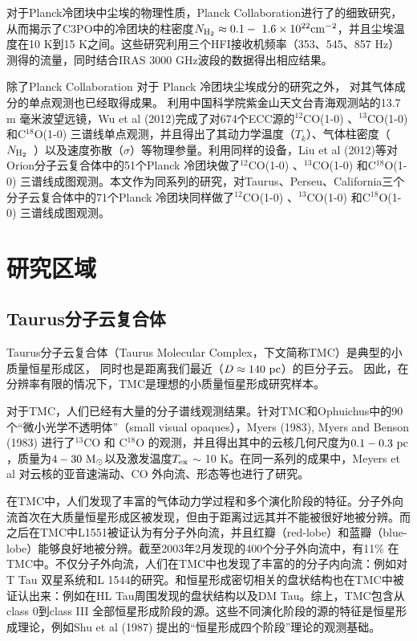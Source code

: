 \documentclass[UTF8]{pkuthss}
\newcommand{\cob}{$^{13}$CO }
\newcommand{\coc}{C$^{18}$O }
\newcommand{\coaa}{$^{12}$CO(1-0) }
\newcommand{\cobb}{$^{13}$CO(1-0) }
\newcommand{\cocc}{C$^{18}$O(1-0) }
\newcommand{\texc}{$T_{\rm {ex}}$ }
\newcommand{\nhyd}{$N_{\rm H_2}$\ }
\begin{document}
		对于Planck冷团块中尘埃的物理性质，Planck Collaboration进行了的细致研究，从而揭示了C3PO中的冷团块的柱密度$N_ {\rm H_2} \approx 0.1 \rm - \ 1.6 \times 10^{22} \rm cm^{-2}$，并且尘埃温度在10 K到15 K之间\supercite{2011A&A...536A..23P}。这些研究利用三个HFI接收机频率（353、545、857 Hz）测得的流量，同时结合IRAS 3000 GHz波段的数据得出相应结果\supercite{2011A&A...536A..23P,2011A&A...536A..22P}。

		除了Planck Collaboration 对于 Planck 冷团块尘埃成分的研究之外， 对其气体成分的单点观测也已经取得成果。 利用中国科学院紫金山天文台青海观测站的13.7 m 毫米波望远镜，Wu et al (2012)完成了对674个ECC源的\coaa 、\cobb  和\cocc  三谱线单点观测，并且得出了其动力学温度（$T_k$）、气体柱密度（\nhyd）以及速度弥散（$\sigma$）等物理参量\supercite{wu2012gas}。利用同样的设备，Liu et al (2012)等对Orion分子云复合体中的51个Planck 冷团块做了\coaa 、\cobb  和\cocc  三谱线成图观测\supercite{LiuTie}。本文作为同系列的研究，对Taurus、Perseu、California三个分子云复合体中的71个Planck 冷团块同样做了\coaa 、\cobb  和\cocc  三谱线成图观测。

	\section{研究区域}

		\subsection{Taurus分子云复合体}

			Taurus分子云复合体（Taurus Molecular Complex，下文简称TMC）是典型的小质量恒星形成区， 同时也是距离我们最近（$D\approx 140\rm\ pc$）的巨分子云\supercite{1987ApJ...322..706D}。 因此，在分辨率有限的情况下，TMC是理想的小质量恒星形成研究样本。

			对于TMC，人们已经有大量的分子谱线观测结果。针对TMC和Ophuichus中的90个“微小光学不透明体”（small visual opaques），Myers (1983), Myers and Benson (1983) 进行了\cob 和 \coc 的观测，并且得出其中的云核几何尺度为$0.1-0.3 \ \rm pc$，质量为$4-30\ \rm M_\odot$以及激发温度\texc $\sim$ 10 K\supercite{1983ApJ...264..517M,1983ApJ...266..309M}。在同一系列的成果中，Meyers et al 对云核的亚音速湍动、CO 外向流、形态等也进行了研究\supercite{1983ApJ...270..105M,1988ApJ...324..907M,1991ApJ...376..561M}。

			在TMC中，人们发现了丰富的气体动力学过程和多个演化阶段的特征。分子外向流首次在大质量恒星形成区被发现，但由于距离过远其并不能被很好地被分辨\supercite{1976ApJ...209L.137Z}。而之后在TMC中L1551被证认为有分子外向流，并且红瓣（red-lobe）和蓝瓣（blue-lobe）能够良好地被分辨\supercite{1980ApJ...239L..17S}。截至2003年2月发现的400个分子外向流中，有11\% 在TMC中\supercite{2004A&A...426..503W}。不仅分子外向流，人们在TMC中也发现了丰富的的分子内向流：例如对T Tau 双星系统\supercite{1994ApJ...425L..45V}和L 1544的研究\supercite{1998ApJ...504..900T}。和恒星形成密切相关的盘状结构也在TMC中被证认出来：例如在HL Tau周围发现的盘状结构\supercite{1991ApJ...382L..31S}以及DM Tau\supercite{1995ApJ...453..384S}。综上，TMC包含从class 0到class III 全部恒星形成阶段的源。这些不同演化阶段的源的特征是恒星形成理论，例如Shu et al (1987) 提出的“恒星形成四个阶段”理论\supercite{shu1987star}的观测基础。
\end{document}
